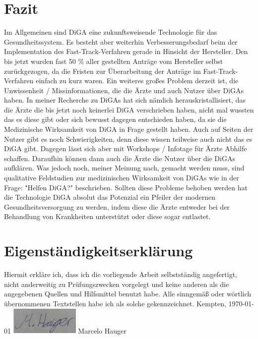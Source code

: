 \documentclass{article}
\begin{document}
	\section{Fazit}
		Im Allgemeinen sind DiGA eine zukunftsweisende Technologie für das Gesundheitssystem. Es besteht aber weiterhin Verbesserungsbedarf beim der Implementation des Fast-Track-Verfahren gerade in Hinsicht der Hersteller. Den bis jetzt wurden fast 50 \% aller gestellten Anträge vom Hersteller selbst zurückgezogen, da die Fristen zur Überarbeitung der Anträge im Fast-Track-Verfahren einfach zu kurz waren. Ein weiteres großes Problem derzeit ist, die Unwissenheit / Missinformationen, die die Ärzte und auch Nutzer über DiGAs haben. In meiner Recherche zu DiGAs hat sich nämlich herauskristallisiert, das die Ärzte die bis jetzt noch keinerlei DiGA verschrieben haben, nicht mal wussten das es diese gibt oder sich bewusst dagegen entschieden haben, da sie die Medizinische Wirksamkeit von DiGA in Frage gestellt haben. Auch auf Seiten der Nutzer gibt es noch Schwierigkeiten, denn diese wissen teilweise auch nicht das es DiGA gibt. Dagegen lässt sich aber mit Workshops / Infotage für Ärzte Abhilfe schaffen. Daraufhin können dann auch die Ärzte die Nutzer über die DiGAs aufklären. Was jedoch noch, meiner Meinung nach, gemacht werden muss, sind qualitative Feldstudien zur medizinischen Wirksamkeit von DiGAs wie in der Frage: "Helfen DiGA?" beschrieben. Sollten diese Probleme behoben werden hat die Technologie DiGA absolut das Potenzial ein Pfeiler der modernen Gesundheitsversorgung zu werden, indem diese die Ärzte entweder bei der Behandlung von Krankheiten unterstützt oder diese sogar entlastet.
		\newpage
	\section{Eigenständigkeitserklärung}
		Hiermit erkläre ich, dass ich die vorliegende Arbeit selbstständig angefertigt, nicht anderweitig zu Prüfungszwecken vorgelegt und keine anderen als die angegebenen Quellen und Hilfsmittel benutzt habe.
		\newline  
		\newline
		Alle sinngemäß oder wörtlich übernommenen Textstellen habe ich als solche gekennzeichnet.
		\newline
		\newline
		\newline
		Kempten, \today 
		\newline
		\newline
		\newline
		\includegraphics[width=0.25\textwidth]{./grafiken/unterschrift} 
		\newline
		Marcelo Hauger 
		\newpage
		

			   	 
\end{document}
